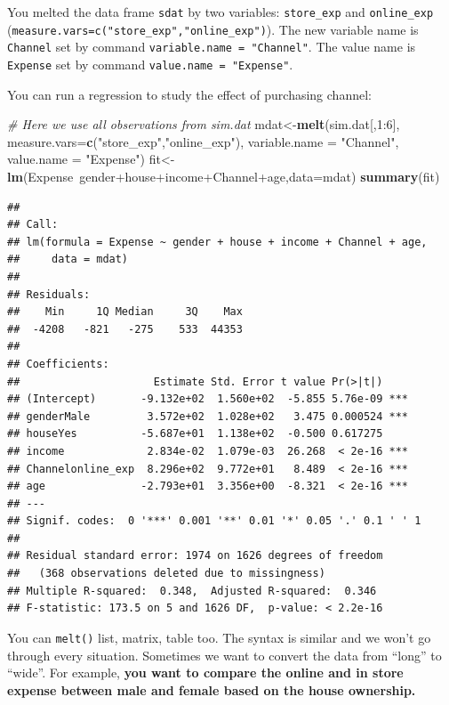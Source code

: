 \documentclass[]{book}
\newenvironment{Shaded}{\begin{snugshade}}{\end{snugshade}}
\newcommand{\KeywordTok}[1]{\textcolor[rgb]{0.13,0.29,0.53}{\textbf{{#1}}}}
\newcommand{\DataTypeTok}[1]{\textcolor[rgb]{0.13,0.29,0.53}{{#1}}}
\newcommand{\DecValTok}[1]{\textcolor[rgb]{0.00,0.00,0.81}{{#1}}}
\newcommand{\StringTok}[1]{\textcolor[rgb]{0.31,0.60,0.02}{{#1}}}
\newcommand{\CommentTok}[1]{\textcolor[rgb]{0.56,0.35,0.01}{\textit{{#1}}}}
\newcommand{\NormalTok}[1]{{#1}}
\theoremstyle{definition}
\theoremstyle{definition}
\theoremstyle{remark}
\begin{document}
You melted the data frame \texttt{sdat} by two variables:
\texttt{store\_exp} and \texttt{online\_exp}
(\texttt{measure.vars=c("store\_exp","online\_exp")}). The new variable
name is \texttt{Channel} set by command
\texttt{variable.name\ =\ "Channel"}. The value name is \texttt{Expense}
set by command \texttt{value.name\ =\ "Expense"}.

You can run a regression to study the effect of purchasing channel:

\begin{Shaded}
\begin{Highlighting}[]
\CommentTok{# Here we use all observations from sim.dat}
\NormalTok{mdat<-}\KeywordTok{melt}\NormalTok{(sim.dat[,}\DecValTok{1}\NormalTok{:}\DecValTok{6}\NormalTok{], }\DataTypeTok{measure.vars=}\KeywordTok{c}\NormalTok{(}\StringTok{"store_exp"}\NormalTok{,}\StringTok{"online_exp"}\NormalTok{),}
            \DataTypeTok{variable.name =} \StringTok{"Channel"}\NormalTok{,}
              \DataTypeTok{value.name =} \StringTok{"Expense"}\NormalTok{)}
\NormalTok{fit<-}\KeywordTok{lm}\NormalTok{(Expense~gender+house+income+Channel+age,}\DataTypeTok{data=}\NormalTok{mdat)}
\KeywordTok{summary}\NormalTok{(fit)}
\end{Highlighting}
\end{Shaded}

\begin{verbatim}
## 
## Call:
## lm(formula = Expense ~ gender + house + income + Channel + age, 
##     data = mdat)
## 
## Residuals:
##    Min     1Q Median     3Q    Max 
##  -4208   -821   -275    533  44353 
## 
## Coefficients:
##                     Estimate Std. Error t value Pr(>|t|)    
## (Intercept)       -9.132e+02  1.560e+02  -5.855 5.76e-09 ***
## genderMale         3.572e+02  1.028e+02   3.475 0.000524 ***
## houseYes          -5.687e+01  1.138e+02  -0.500 0.617275    
## income             2.834e-02  1.079e-03  26.268  < 2e-16 ***
## Channelonline_exp  8.296e+02  9.772e+01   8.489  < 2e-16 ***
## age               -2.793e+01  3.356e+00  -8.321  < 2e-16 ***
## ---
## Signif. codes:  0 '***' 0.001 '**' 0.01 '*' 0.05 '.' 0.1 ' ' 1
## 
## Residual standard error: 1974 on 1626 degrees of freedom
##   (368 observations deleted due to missingness)
## Multiple R-squared:  0.348,  Adjusted R-squared:  0.346 
## F-statistic: 173.5 on 5 and 1626 DF,  p-value: < 2.2e-16
\end{verbatim}

You can \texttt{melt()} list, matrix, table too. The syntax is similar
and we won't go through every situation. Sometimes we want to convert
the data from ``long'' to ``wide''. For example, \textbf{you want to
compare the online and in store expense between male and female based on
the house ownership. }
\end{document}
